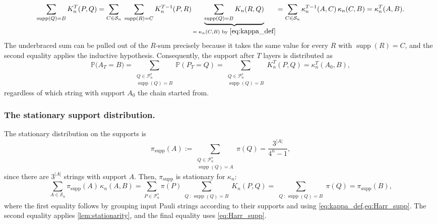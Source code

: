 \documentclass[
    aps,
    superscriptaddress,
    onecolumn,
    10pt,
    prx,
    nofootinbib
]{revtex4-2}
\theoremstyle{namedstatement}
\theoremstyle{plain}
\begin{document}
\begin{equation}
    \sum_{\operatorname{supp}(Q)=B} K_n^{T}(P,Q)
    = \sum_{C \in \mathcal{S}_n}\; \sum_{\operatorname{supp}(R)=C} K_n^{T-1}(P,R)
      \underbrace{\sum_{\operatorname{supp}(Q)=B} K_n(R,Q)}_{=\;\kappa_n(C,B) \text{ by } \cref{eq:kappa_def}}
    = \sum_{C \in \mathcal{S}_n} \kappa_n^{T-1}(A,C)\,\kappa_n(C,B)
    = \kappa_n^{T}(A,B).
\end{equation}
The underbraced sum can be pulled out of the $R$-sum precisely because it takes the same value for every $R$ with $\operatorname{supp}(R) = C$, and the second equality applies the inductive hypothesis. Consequently, the support after $T$ layers is     distributed as
\begin{equation}\label{eq:support_T_law}
    \mathbb{P}\big(A_T = B\big)
    = \sum_{\substack{Q \in \mathcal{P}_n^\star\\ \operatorname{supp}(Q) = B}} \mathbb{P}(P_T = Q)
    = \sum_{\substack{Q \in \mathcal{P}_n^\star\\ \operatorname{supp}(Q) = B}} K_n^{T}(P,Q)
    = \kappa_n^{T}(A_0, B),
\end{equation}
regardless of which string with support $A_0$ the chain started from.
 
\subsubsection{The stationary support distribution.} The stationary distribution on the supports is
\begin{equation}
 \label{eq:Harr_supp}
    \pi_{\mathrm{supp}}(A) := \sum_{\substack{Q \in \mathcal{P}_n^\star\\ \operatorname{supp}(Q) = A}} \pi(Q)= \frac{3^{|A|}}{4^n-1},
\end{equation}
since there are $3^{|A|}$ strings with support $A$. Then, $\pi_{\mathrm{supp}}$ is stationary for $\kappa_n$:
\begin{equation}
\label{eq:stationarity_pi_supp}
    \sum_{A \in \mathcal{S}_n} \pi_{\mathrm{supp}}(A)\, \kappa_n(A,B)
    = \sum_{P \in \mathcal{P}_n^\star} \pi(P) \!\!\sum_{\substack{Q\,:\, \operatorname{supp}(Q)=B}}\!\! K_n(P,Q)
    = \!\!\sum_{\substack{Q\,:\,\operatorname{supp}(Q)=B}}\!\! \pi(Q)
    = \pi_{\mathrm{supp}}(B),
\end{equation}
where the first equality follows by grouping input Pauli strings according to their supports and using \cref{eq:kappa_def,eq:Harr_supp}. The second equality applies \cref{lem:stationarity}, and the final equality uses \cref{eq:Harr_supp}.
 
\end{document}

